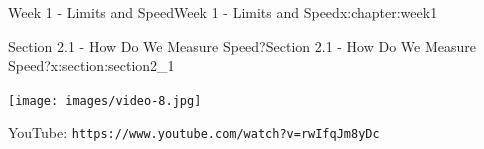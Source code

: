 \documentclass[oneside,10pt,]{book}
\newcommand{\mono}[1]{\texttt{#1}}
\numberwithin{equation}{section}
\newlength{\qrsize}
\newlength{\previewwidth}
\begin{document}
\begin{chapterptx}{Week 1 - Limits and Speed}{}{Week 1 - Limits and Speed}{}{}{x:chapter:week1}
\begin{sectionptx}{Section 2.1 - How Do We Measure Speed?}{}{Section 2.1 - How Do We Measure Speed?}{}{}{x:section:section2_1}
\setlength{\qrsize}{9em}
\setlength{\previewwidth}{\linewidth}
\addtolength{\previewwidth}{-\qrsize}
\begin{tcbraster}[raster columns=2, raster column skip=1pt, raster halign=center, raster force size=false, raster left skip=0pt, raster right skip=0pt]%
\begin{tcolorbox}[previewstyle, width=\previewwidth]%
\texttt{[image: images/video-8.jpg]}%
\end{tcolorbox}%
\begin{tcolorbox}[qrstyle]%
{\hypersetup{urlcolor=black}}%
\end{tcolorbox}%
\begin{tcolorbox}[captionstyle]%
\small YouTube: \mono{https://www.youtube.com/watch?v=rwIfqJm8yDc}\end{tcolorbox}%
\end{tcbraster}%
\end{sectionptx}
\end{chapterptx}
%
%
\typeout{************************************************}
\typeout{************************************************}
%
\end{document}
